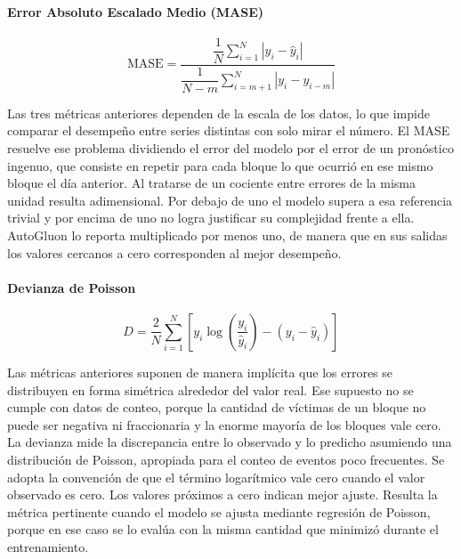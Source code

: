\paragraph{Error Absoluto Escalado Medio (MASE)}

\begin{equation}
\mathrm{MASE} = \frac{\dfrac{1}{N} \displaystyle\sum_{i=1}^{N} \left| y_i - \hat{y}_i \right|}{\dfrac{1}{N-m} \displaystyle\sum_{i=m+1}^{N} \left| y_i - y_{i-m} \right|}
\label{eq:mase}
\end{equation}

Las tres métricas anteriores dependen de la escala de los datos, lo que impide comparar el desempeño entre series distintas con solo mirar el número. El MASE resuelve ese problema dividiendo el error del modelo por el error de un pronóstico ingenuo, que consiste en repetir para cada bloque lo que ocurrió en ese mismo bloque el día anterior. Al tratarse de un cociente entre errores de la misma unidad resulta adimensional. Por debajo de uno el modelo supera a esa referencia trivial y por encima de uno no logra justificar su complejidad frente a ella. AutoGluon lo reporta multiplicado por menos uno, de manera que en sus salidas los valores cercanos a cero corresponden al mejor desempeño.

\paragraph{Devianza de Poisson}

\begin{equation}
D = \frac{2}{N} \sum_{i=1}^{N} \left[ y_i \log\!\left( \frac{y_i}{\hat{y}_i} \right) - \left( y_i - \hat{y}_i \right) \right]
\label{eq:devianza-poisson}
\end{equation}

Las métricas anteriores suponen de manera implícita que los errores se distribuyen en forma simétrica alrededor del valor real. Ese supuesto no se cumple con datos de conteo, porque la cantidad de víctimas de un bloque no puede ser negativa ni fraccionaria y la enorme mayoría de los bloques vale cero. La devianza mide la discrepancia entre lo observado y lo predicho asumiendo una distribución de Poisson, apropiada para el conteo de eventos poco frecuentes. Se adopta la convención de que el término logarítmico vale cero cuando el valor observado es cero. Los valores próximos a cero indican mejor ajuste. Resulta la métrica pertinente cuando el modelo se ajusta mediante regresión de Poisson, porque en ese caso se lo evalúa con la misma cantidad que minimizó durante el entrenamiento.


